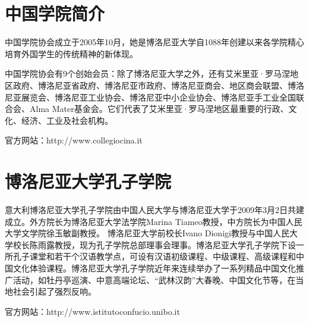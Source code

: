 \section{中国学院简介}

         中国学院协会成立于2005年10月，她是博洛尼亚大学自1088年创建以来各学院精心培育外国学生的传统精神的新体现。

          中国学院协会有9个创始会员：除了博洛尼亚大学之外，还有艾米里亚·罗马涅地区政府、博洛尼亚省政府、博洛尼亚市政府、博洛尼亚商会、地区商会联盟、博洛尼亚展览会、博洛尼亚工业协会、博洛尼亚中小企业协会、博洛尼亚手工业全国联合会、Alma Mater基金会。它们代表了艾米里亚·罗马涅地区最重要的行政、文化、经济、工业及社会机构。


官方网站：http://www.collegiocina.it

\section{博洛尼亚大学孔子学院}

意大利博洛尼亚大学孔子学院由中国人民大学与博洛尼亚大学于2009年3月2日共建成立。外方院长为博洛尼亚大学法学院Marina Tiameo教授，中方院长为中国人民大学文学院徐玉敏副教授。 博洛尼亚大学前校长Ivano Dionigi教授与中国人民大学校长陈雨露教授，现为孔子学院总部理事会理事。博洛尼亚大学孔子学院下设一所孔子课堂和若干个汉语教学点，可设有汉语初级课程、中级课程、高级课程和中国文化体验课程。博洛尼亚大学孔子学院近年来连续举办了一系列精品中国文化推广活动，如牡丹亭巡演、中意高端论坛、“武林汉韵”大春晚、中国文化节等，在当地社会引起了强烈反响。

官方网站：http://www.istitutoconfucio.unibo.it

